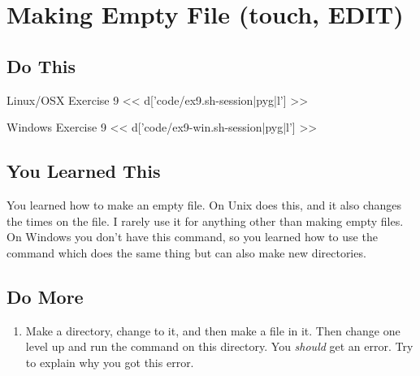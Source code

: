 \chapter{Making Empty File (touch, EDIT)}

\section{Do This}

\begin{code}{Linux/OSX Exercise 9}
<< d['code/ex9.sh-session|pyg|l'] >>
\end{code}

\begin{code}{Windows Exercise 9}
<< d['code/ex9-win.sh-session|pyg|l'] >>
\end{code}

\section{You Learned This}

You learned how to make an empty file.  On Unix  does this, and
it also changes the times on the file.  I rarely use it for anything other than
making empty files.  On Windows you don't have this command, so you learned
how to use the  command which does the same thing but can
also make new directories.

\section{Do More}

\begin{enumerate}
\item Make a directory, change to it, and then make a file in it.  Then change
    one level up and run the  command on this directory.  You
    \emph{should} get an error.  Try to explain why you got this error.
\end{enumerate}

